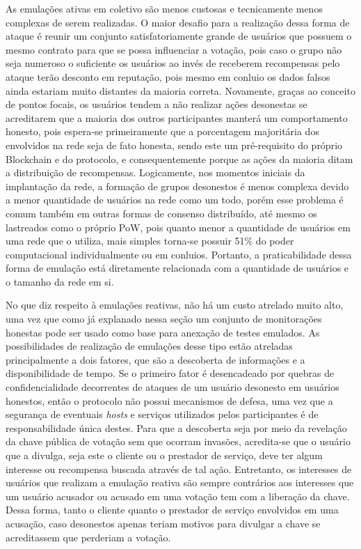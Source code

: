 As emulações ativas em coletivo são menos custosas e tecnicamente menos complexas de serem realizadas. O maior desafio para a realização dessa forma de ataque é reunir um conjunto satisfatoriamente grande de usuários que possuem o mesmo contrato para que se possa influenciar a votação, pois caso o grupo não seja numeroso o suficiente os usuários ao invés de receberem recompensas pelo ataque terão desconto em reputação, pois mesmo em conluio os dados falsos ainda estariam muito distantes da maioria correta. Novamente, graças ao conceito de pontos focais, os usuários tendem a não realizar ações desonestas se acreditarem que a maioria dos outros participantes manterá um comportamento honesto, pois espera-se primeiramente que a porcentagem majoritária dos envolvidos na rede seja de fato honesta, sendo este um pré-requisito do próprio Blockchain e do protocolo, e consequentemente porque as ações da maioria ditam a distribuição de recompensas. Logicamente, nos momentos iniciais da implantação da rede, a formação de grupos desonestos é menos complexa devido a menor quantidade de usuários na rede como um todo, porém esse problema é comum também em outras formas de consenso distribuído, até mesmo os lastreados como o próprio \ac{PoW}, pois quanto menor a quantidade de usuários em uma rede que o utiliza, mais simples torna-se possuir 51\% do poder computacional individualmente ou em conluios. Portanto, a praticabilidade dessa forma de emulação está diretamente relacionada com a quantidade de usuários e o tamanho da rede em si. 

%
No que diz respeito à emulações reativas, não há um custo atrelado muito alto, uma vez que como já explanado nessa seção um conjunto de monitorações honestas pode ser usado como base para anexação de testes emulados. As possibilidades de realização de emulações desse tipo estão atreladas principalmente a dois fatores, que são a descoberta de informações e a disponibilidade de tempo. Se o primeiro fator é desencadeado por quebras de confidencialidade decorrentes de ataques de um usuário desonesto em usuários honestos, então o protocolo não possui mecanismos de defesa, uma vez que a segurança de eventuais \textit{hosts} e serviços utilizados pelos participantes é de responsabilidade única destes. Para que a descoberta seja por meio da revelação da chave pública de votação sem que ocorram invasões, acredita-se que o usuário que a divulga, seja este o cliente ou o prestador de serviço, deve ter algum interesse ou recompensa buscada através de tal ação. Entretanto, os interesses de usuários que realizam a emulação reativa são sempre contrários aos interesses que um usuário acusador ou acusado em uma votação tem com a liberação da chave. Dessa forma, tanto o cliente quanto o prestador de serviço envolvidos em uma acusação, caso desonestos apenas teriam motivos para divulgar a chave se acreditassem que perderiam a votação. 

